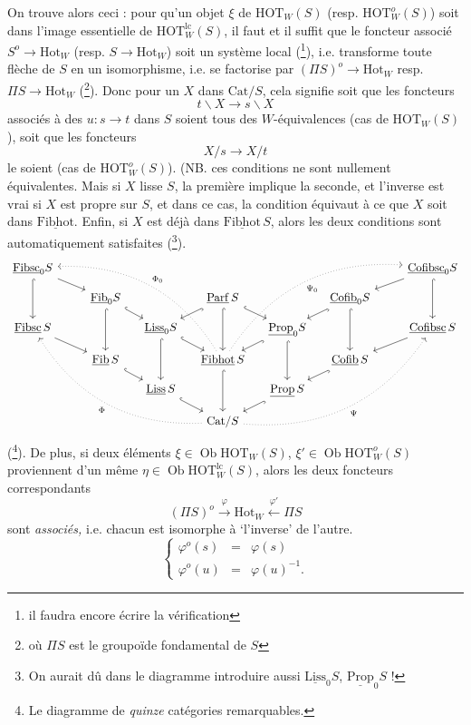 \documentclass[11pt]{article}
\newcommand{\printedpage}[1]{\marginpar{\footnotesize p.~#1}}
\newcommand{\msp}[1]{\marginpar{\footnotesize [#1]}}
\newcommand{\HOT}{\mathrm{HOT}}
\newcommand{\Cat}{\mathrm{Cat}}
\newcommand{\Hot}{\mathrm{Hot}}
\newcommand{\Ob}{\operatorname{Ob}}
\newcommand{\ul}[1]{\underline{\mathrm{#1}}}
\begin{document}
On trouve alors ceci : pour qu'un objet $\xi$ de $\HOT_W(S)$ (resp. $\HOT^o_W(S)$) soit dans l'image essentielle de $\HOT^{\mathrm{lc}}_W(S)$, il faut et il suffit que le foncteur associé $S^o\longrightarrow\Hot_W$ (resp. $S\longrightarrow\Hot_W$) soit un système local (\footnote{il faudra encore écrire la vérification}), i.e. transforme toute flèche de $S$ en un isomorphisme, i.e. se factorise par $(\Pi S)^o\longrightarrow\Hot_W$ resp. $\Pi S\longrightarrow\Hot_W$ (\footnote{où $\Pi S$ est le groupoïde fondamental de $S$}). Donc pour un $X$ dans $\Cat/S$, cela signifie soit que les foncteurs
\[ t\backslash X\longrightarrow s\backslash X \]
associés à des $u : s\longrightarrow t$ dans $S$ soient tous des $W$-équivalences (cas de $\HOT_W(S)$), soit que les foncteurs
\[ X/s\longrightarrow X/t \]
le soient (cas de $\HOT^o_W(S)$). (NB. ces conditions ne sont nullement équivalentes. Mais si $X$ lisse $S$,
\msp{page 75}
la première implique la seconde, et l'inverse est vrai si $X$ est propre sur $S$, et dans ce cas, la condition équivaut à ce que $X$ soit dans $\ul{Fibhot}$. Enfin, si $X$ est déjà dans $\ul{Fibhot}\,S$, alors les deux conditions sont automatiquement satisfaites (\footnote{On aurait dû dans le diagramme introduire aussi $\ul{Liss}_0S$, $\ul{Prop}_0S$ !}).
\[
\begin{tikzcd}[column sep=small, row sep=small]
\ul{Fibsc}_0S \arrow[dd,hook] \arrow[drr] & & & & & & & & \ul{Cofibsc}_0S \arrow[dll] \arrow[dd,hook] \\
 & & \ul{Fib}_0S \arrow[dd,hook] \arrow[dr,hook] & & \ul{Parf}\,S \arrow[dl,hook] \arrow[dd,hook] \arrow[dr,hook] & & \ul{Cofib}_0S \arrow[dl,hook] \arrow[dd,hook] & & \\
\ul{Fibsc}\,S \arrow[drr] & & & \ul{Liss}_0S \arrow[dr,hook] \arrow[dd,hook] & & \ul{Prop}_0S \arrow[dl,hook] \arrow[dd,hook] & & & \ul{Cofibsc}\,S \arrow[dll] \\
 & & \ul{Fib}\,S \arrow[dr,hook] & & \ul{Fibhot}\,S \arrow[dd,hook] \arrow[uuullll,dotted,bend right,"\Phi_0"'] \arrow[uuurrrr,dotted,bend left,"\Psi_0"'] & & \ul{Cofib}\,S \arrow[dl,hook] & & \\
 & & & \ul{Liss}\,S \arrow[dr,hook] & & \ul{Prop}\,S \arrow[dl,hook] & & & \\
 & & & & \Cat/S \arrow[uuullll,dotted,bend left,"\Phi"] \arrow[uuurrrr,dotted,bend right,"\Psi"'] & & & &
\end{tikzcd}
\]
\printedpage{47}
(\footnote{Le diagramme de \textit{quinze} catégories remarquables.}). De plus, si deux éléments $\xi\in\Ob\HOT_W(S)$, $\xi'\in\Ob\HOT^o_W(S)$ proviennent d'un même $\eta\in\Ob\HOT^{\mathrm{lc}}_W(S)$, alors les deux foncteurs correspondants
\[ (\Pi S)^o\xrightarrow{\ \varphi\ }\Hot_W\xleftarrow{\ \varphi'\ }\Pi S \]
sont \textit{associés,} i.e. chacun est isomorphe à `l'inverse' de l'autre.
\[
\left\{
\begin{array}{lcl}
\varphi^o(s) & = & \varphi(s)\\
\varphi^o(u) & = & \varphi(u)^{-1}.
\end{array}
\right.
\]
\end{document}
